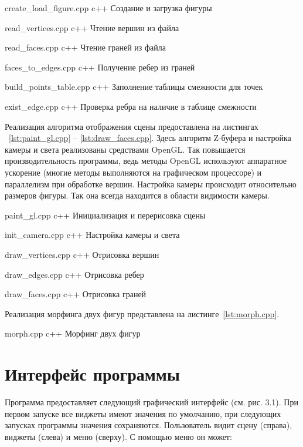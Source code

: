 {create_load_figure.cpp}
{c++}
{Создание и загрузка фигуры}

{read_vertices.cpp}
{c++}
{Чтение вершин из файла}

{read_faces.cpp}
{c++}
{Чтение граней из файла}

{faces_to_edges.cpp}
{c++}
{Получение ребер из граней}

{build_points_table.cpp}
{c++}
{Заполнение таблицы смежности для точек}

{exist_edge.cpp}
{c++}
{Проверка ребра на наличие в таблице смежности}


Реализация алгоритма отображения сцены предоставлена на листингах ~\ref{lst:paint_gl.cpp} -- \ref{lst:draw_faces.cpp}. 
Здесь алгоритм Z-буфера и настройка камеры и света реализованы средствами OpenGL.
Так повышается производительность программы, ведь методы OpenGL используют аппаратное ускорение (многие методы выполняются на графическом процессоре) и параллелизм при обработке вершин. 
Настройка камеры происходит относительно размеров фигуры. 
Так она всегда находится в области видимости камеры.

{paint_gl.cpp}
{c++}
{Инициализация и перерисовка сцены}

{init_camera.cpp}
{c++}
{Настройка камеры и света}

{draw_vertices.cpp}
{c++}
{Отрисовка вершин}

{draw_edges.cpp}
{c++}
{Отрисовка ребер}

{draw_faces.cpp}
{c++}
{Отрисовка граней}

Реализация морфинга двух фигур представлена на листинге~\ref{lst:morph.cpp}.

{morph.cpp}
{c++}
{Морфинг двух фигур}


\section{Интерфейс программы}

Программа предоставляет следующий графический интерфейс (см. рис. 3.1). 
При первом запуске все виджеты имеют значения по умолчанию, при следующих запусках программы значения сохраняются.
Пользователь видит сцену (справа), виджеты (слева) и меню (сверху). 
С помощью меню он может:

